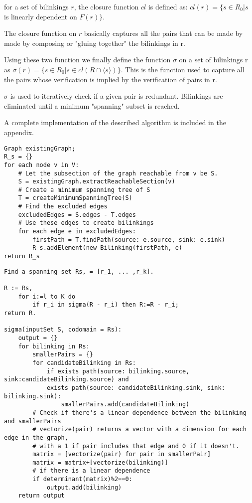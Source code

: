 \documentclass[sigplan,review,anonymous]{acmart}
\begin{document}
for a set of bilinkings $r$, the closure function $cl$ is defined as:
$cl(r) = \{ s\in R_0| s$ is linearly dependent on $F(r) \}$.

The closure function on $r$ basically captures all the pairs that can be made by made by composing or "gluing together" the bilinkings in r. 

Using these two function we finally define the function $\sigma$ on a set of bilinkings r as
$\sigma(r) = \{s \in R_0 | s\in cl(R\cap \langle s \rangle) \}$.
This is the function used to capture all the pairs whose verification is implied by the verification of pairs in r.

$\sigma$ is used to iteratively check if a given pair is redundant. Bilinkings are eliminated until a minimum "spanning" subset is reached.

A complete implementation of the described algorithm is included in the appendix.

\begin{verbatim}
Graph existingGraph;
R_s = {}
for each node v in V:
    # Let the subsection of the graph reachable from v be S.
    S = existingGraph.extractReachableSection(v)
    # Create a minimum spanning tree of S
    T = createMinimumSpanningTree(S)
    # Find the excluded edges
    excludedEdges = S.edges - T.edges
    # Use these edges to create bilinkings
    for each edge e in excludedEdges:
        firstPath = T.findPath(source: e.source, sink: e.sink)
        R_s.addElement(new Bilinking(firstPath, e)
return R_s
\end{verbatim}

\begin{verbatim}
Find a spanning set Rs, = [r_1, ... ,r_k].

R := Rs,
    for i:=l to K do
        if r_i in sigma(R - r_i) then R:=R - r_i;
return R.

sigma(inputSet S, codomain = Rs):
    output = {}
    for bilinking in Rs:
        smallerPairs = {}
        for candidateBilinking in Rs:
            if exists path(source: bilinking.source, sink:candidateBilinking.source) and
            exists path(source: candidateBilinking.sink, sink: bilinking.sink):
                smallerPairs.add(candidateBilinking)
        # Check if there's a linear dependence between the bilinking and smallerPairs
        # vectorize(pair) returns a vector with a dimension for each edge in the graph,
        # with a 1 if pair includes that edge and 0 if it doesn't.
        matrix = [vectorize(pair) for pair in smallerPair]
        matrix = matrix+[vectorize(bilinking)]
        # if there is a linear dependence
        if determinant(matrix)%2==0:
            output.add(bilinking)
    return output
                
\end{verbatim}
\end{document}
